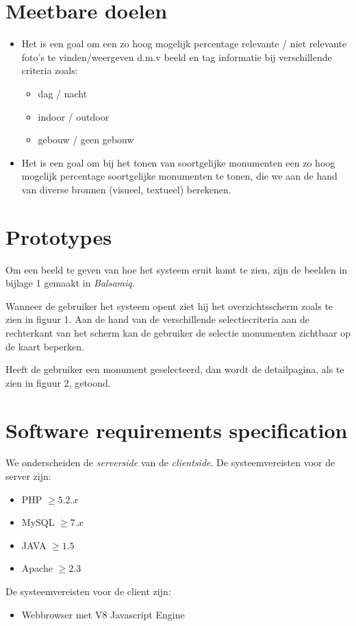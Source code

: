 \documentclass{article}
\begin{document}
\section{Meetbare doelen}
\begin{itemize}
\item Het is een goal om een zo hoog mogelijk percentage relevante / niet relevante foto's te vinden/weergeven d.m.v beeld en tag informatie bij verschillende criteria zoals:
\begin{itemize}
\item dag / nacht
\item indoor / outdoor
\item gebouw / geen gebouw
\end{itemize}
\item Het is een goal om bij het tonen van soortgelijke monumenten een zo hoog mogelijk percentage soortgelijke monumenten te tonen, die we aan de hand van diverse bronnen (visueel, textueel) berekenen.
\end{itemize}
\section{Prototypes}
Om een beeld te geven van hoe het systeem eruit komt te zien, zijn de beelden in bijlage 1 gemaakt in \emph{Balsamiq}. 

Wanneer de gebruiker het systeem opent ziet hij het overzichtsscherm zoals te zien in figuur 1. Aan de hand van de verschillende selectiecriteria aan de rechterkant van het scherm kan de gebruiker de selectie monumenten zichtbaar op de kaart beperken.

Heeft de gebruiker een monument geselecteerd, dan wordt de detailpagina, als te zien in figuur 2, getoond. 

\section{Software requirements specification}
We onderscheiden de \emph{serverside} van de \emph{clientside}.
De systeemvereisten voor de server zijn:
\begin{itemize}
	\item{PHP $\geq 5.2.x$}
	\item{MySQL $\geq 7.x$}
	\item{JAVA $\geq 1.5$}
	\item{Apache $\geq 2.3$}
\end{itemize}
De systeemvereisten voor de client zijn:
\begin{itemize}
	\item{Webbrowser met V8 Javascript Engine}
\end{itemize}
\clearpage
\end{document}
